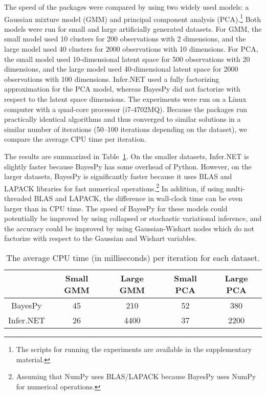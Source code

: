 \documentclass[twoside,11pt]{article}
\begin{document}
The speed of the packages were compared by using two widely used models: a
Gaussian mixture model (GMM) and principal component analysis
(PCA).\footnote{The scripts for running the experiments are available in the
  supplementary material.}  Both models were run for small and large
artificially generated datasets.  For GMM, the small model used 10 clusters for
200 observations with 2 dimensions, and the large model used 40 clusters for
2000 observations with 10 dimensions.  For PCA, the small model used
10-dimensional latent space for 500 observations with 20 dimensions, and the
large model used 40-dimensional latent space for 2000 observations with 100
dimensions.  Infer.NET used a fully factorizing approximation for the PCA model,
whereas BayesPy did not factorize with respect to the latent space dimensions.
The experiments were run on a Linux computer with a quad-core processor
(i7-4702MQ).  Because the packages run practically identical algorithms and thus
converged to similar solutions in a similar number of iterations (50--100
iterations depending on the dataset), we compare the average CPU time per
iteration.


The results are summarized in Table~\ref{tab:speed}.  On the smaller datasets,
Infer.NET is slightly faster because BayesPy has some overhead of Python.
However, on the larger datasets, BayesPy is significantly faster because it uses
BLAS and LAPACK libraries for fast numerical operations.\footnote{Assuming that
  NumPy uses BLAS/LAPACK because BayesPy uses NumPy for numerical operations.}
In addition, if using multi-threaded BLAS and LAPACK, the difference in
wall-clock time can be even larger than in CPU time.  The speed of BayesPy for
these models could potentially be improved by using collapsed or stochastic
variational inference, and the accuracy could be improved by using
Gaussian-Wishart nodes which do not factorize with respect to the Gaussian and
Wishart variables.

\begin{table}[tb]
  \centering
  \caption{The average CPU time (in milliseconds) per iteration for each dataset.}
  \small
  \begin{tabular}{ccccc}
    &
    Small GMM
    &
    Large GMM
    &
    Small PCA
    &
    Large PCA
    \\
    \hline
    BayesPy     & 45 & 210  & 52 & 380
    \\
    Infer.NET   & 26 & 4400 & 37 & 2200
  \end{tabular}
  \label{tab:speed}
\end{table}
\end{document}
